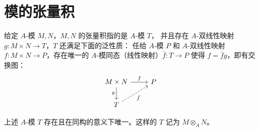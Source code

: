 \section{模的张量积}

给定 $A$-模 $M,N$，$M,N$ 的张量积指的是 $A$-模 $T$，
并且存在 $A$-双线性映射 $g:M\times N\to T$，$T$ 还满足下面的泛性质：
任给 $A$-模 $P$ 和 $A$-双线性映射 $f:M\times N\to P$，存在唯一的
$A$-模同态（线性映射）$\bar f:T\to P$ 使得 $f=\bar fg$，即有交换图：
\[
  \begin{tikzcd}
    M\times N\arrow[d,"g"']\arrow[r,"f"] & P \\
    T\arrow[ur,dashed,"\bar f"'] & 
  \end{tikzcd}  
\]

\begin{proposition}
  上述 $A$-模 $T$ 存在且在同构的意义下唯一。这样的 $T$ 记为
  $M\otimes_A N$。
\end{proposition}
